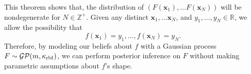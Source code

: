 This theorem shows that, the distribution of $(F(\mathbf{x}_1), \dots F(\mathbf{x}_N))$ will be nondegenerate for $N \in \mathbb{Z}^{+}$.
Given any distinct $\mathbf{x}_1, \dots \mathbf{x}_N$, and $y_1, \ldots, y_N \in \mathbb{R}$, we allow the possibility that
\begin{equation*}
    f(\mathbf{x}_1) = y_1, \dots, f(\mathbf{x}_N) = y_N.
\end{equation*}
Therefore, by modeling our beliefs about $f$ with a Gaussian process $F \sim \mathcal{GP}(m, \kappa_{\mathrm{rbf}})$,
we can perform posterior inference on $F$ without making parametric assumptions about $f$'s shape.

